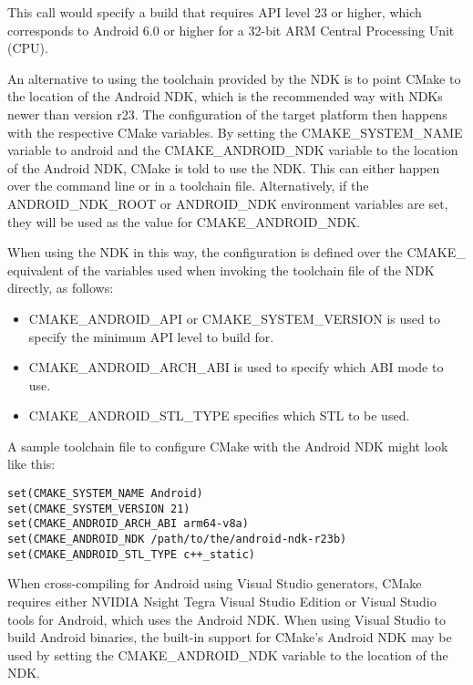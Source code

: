 This call would specify a build that requires API level 23 or higher, which corresponds to Android 6.0 or higher for a 32-bit ARM Central Processing Unit (CPU).

An alternative to using the toolchain provided by the NDK is to point CMake to the location of the Android NDK, which is the recommended way with NDKs newer than version r23. The configuration of the target platform then happens with the respective CMake variables. By setting the CMAKE\_SYSTEM\_NAME variable to android and the CMAKE\_ANDROID\_NDK variable to the location of the Android NDK, CMake is told to use the NDK. This can either happen over the command line or in a toolchain file. Alternatively, if the ANDROID\_NDK\_ROOT or ANDROID\_NDK environment variables are set, they will be used as the value for CMAKE\_ANDROID\_NDK.

When using the NDK in this way, the configuration is defined over the CMAKE\_ equivalent of the variables used when invoking the toolchain file of the NDK directly, as follows:

\begin{itemize}
\item 
CMAKE\_ANDROID\_API or CMAKE\_SYSTEM\_VERSION is used to specify the minimum API level to build for.

\item 
CMAKE\_ANDROID\_ARCH\_ABI is used to specify which ABI mode to use.

\item
CMAKE\_ANDROID\_STL\_TYPE specifies which STL to be used.
\end{itemize}

A sample toolchain file to configure CMake with the Android NDK might look like this:

\begin{lstlisting}[style=styleCMake]
set(CMAKE_SYSTEM_NAME Android)
set(CMAKE_SYSTEM_VERSION 21)
set(CMAKE_ANDROID_ARCH_ABI arm64-v8a)
set(CMAKE_ANDROID_NDK /path/to/the/android-ndk-r23b)
set(CMAKE_ANDROID_STL_TYPE c++_static)
\end{lstlisting}

When cross-compiling for Android using Visual Studio generators, CMake requires either NVIDIA Nsight Tegra Visual Studio Edition or Visual Studio tools for Android, which uses the Android NDK. When using Visual Studio to build Android binaries, the built-in support for CMake's Android NDK may be used by setting the CMAKE\_ANDROID\_NDK variable to the location of the NDK.

